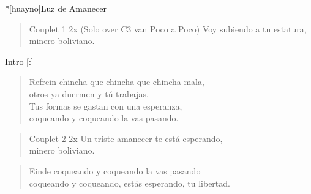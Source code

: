 \clearpage
\begin{song}*[huayno]{Luz de Amanecer}
\begin{verse}{Couplet 1 2x (Solo over C3 van Poco a Poco)}
Voy subiendo a tu estatura, \\
minero boliviano. \hspace{4em} \hspace{1em} 
\end{verse}

\begin{instrumental}{Intro}
\measure{}\measure{}\measure{}\measure{}
\measure{}\measure{}\measure{}\measure{}[:]
\end{instrumental}


\begin{verse}{Refrein}
chincha que chincha que chincha mala,\\
otros ya duermen y tú trabajas,\\
Tus formas se gastan con una esperanza,\\
coqueando y coqueando la vas pasando. \hspace{4em} \hspace{1em} 
\end{verse}


\begin{verse}{Couplet 2 2x}
Un triste amanecer te está esperando,\\
minero boliviano. \hspace{4em} \hspace{1em} 
\end{verse}


\begin{verse}{Einde}
coqueando y coqueando la vas pasando\\
coqueando y coqueando, estás esperando, tu libertad. \hspace{3em} \hspace{2em} \hspace{2em} \hspace{1em} \hspace{1em}
\end{verse}
\end{song}

